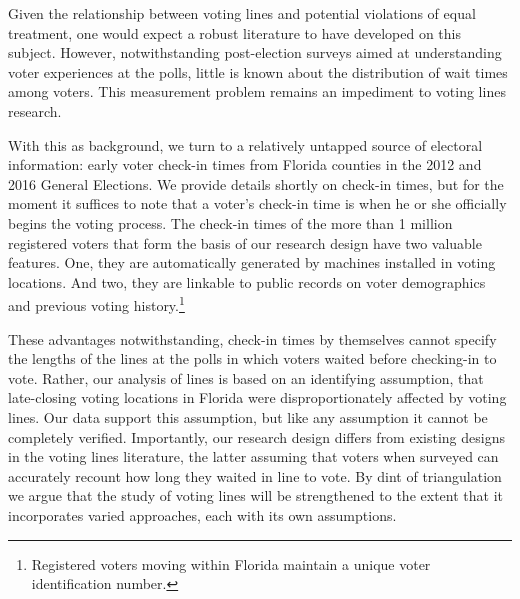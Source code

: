 \documentclass[12pt,titlepage]{article}
\begin{document}
Given the relationship between voting lines and potential violations
of equal treatment, one would expect a robust literature to have
developed on this subject.  However, notwithstanding post-election
surveys aimed at understanding voter experiences at the polls, little
is known about the distribution of wait times among voters. This
measurement problem remains an impediment to voting lines research.

With this as background, we turn to a relatively untapped source of
electoral information: early voter check-in times from Florida
counties in the 2012 and 2016 General Elections. We provide details
shortly on check-in times, but for the moment it suffices to note that
a voter's check-in time is when he or she officially begins the voting
process.  The check-in times of the more than 1 million registered
voters that form the basis of our research design have two valuable
features. One, they are automatically generated by machines installed
in voting locations. And two, they are linkable to public records on
voter demographics and previous voting history.\footnote{Registered
  voters moving within Florida maintain a unique voter identification
  number.}

These advantages notwithstanding, check-in times by themselves cannot
specify the lengths of the lines at the polls in which voters waited
before checking-in to vote.  Rather, our analysis of lines is based on
an identifying assumption, that late-closing voting locations in
Florida were disproportionately affected by voting lines. Our data
support this assumption, but like any assumption it cannot be
completely verified.  Importantly, our research design differs from
existing designs in the voting lines literature, the latter assuming
that voters when surveyed can accurately recount how long they waited
in line to vote. By dint of triangulation we argue that the study of
voting lines will be strengthened to the extent that it incorporates
varied approaches, each with its own assumptions.

\end{document}
